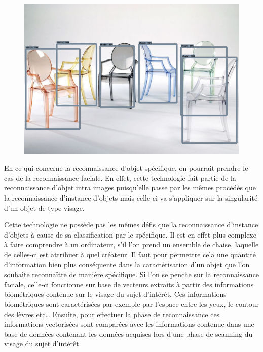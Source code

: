 \documentclass[a4paper,12pt]{article} %
\begin{document}
\newline
\begin{figure}[h] %
  \centering %
  \includegraphics[scale=0.2]{output.png} %
\end{figure}
\newpage
\par
En ce qui concerne la reconnaissance d’objet spécifique, on pourrait prendre le cas de la reconnaissance faciale. En effet, cette technologie fait partie de la reconnaissance d’objet intra images puisqu’elle passe par les mêmes procédés que la reconnaissance d’instance d’objets mais celle-ci va s’appliquer sur la singularité d’un objet de type visage. 
\newline
\par
Cette technologie ne possède pas les mêmes défis que la reconnaissance d’instance d’objets à cause de sa classification par le spécifique. Il est en effet plus complexe à faire comprendre à un ordinateur, s’il l’on prend un ensemble de chaise, laquelle de celles-ci est attribuer à quel créateur. Il faut pour permettre cela une quantité d’information bien plus conséquente dans la caractérisation d’un objet que l’on souhaite reconnaître de manière spécifique. Si l’on se penche sur la reconnaissance faciale, celle-ci fonctionne sur base de vecteurs extraits à partir des informations biométriques contenue sur le visage du sujet d’intérêt. Ces informations biométriques sont caractérisées par exemple par l’espace entre les yeux, le contour des lèvres etc… Ensuite, pour effectuer la phase de reconnaissance ces informations vectorisées sont comparées avec les informations contenue dans une base de données contenant les données acquises lors d’une phase de scanning du visage du sujet d’intérêt. 
\end{document}
